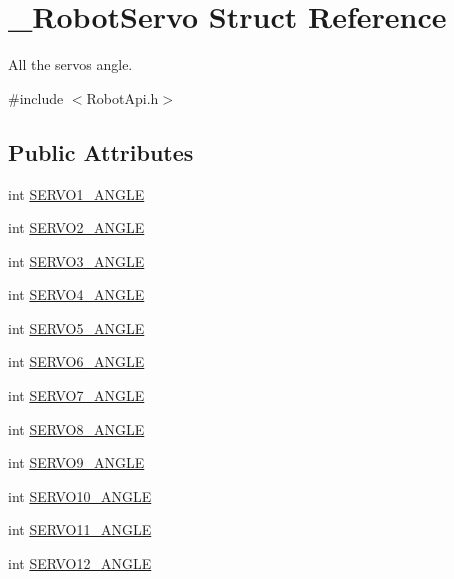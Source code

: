 \hypertarget{struct__RobotServo}{}\section{\+\_\+\+Robot\+Servo Struct Reference}
\label{struct__RobotServo}


All the servos angle.  




{\ttfamily \#include $<$Robot\+Api.\+h$>$}

\subsection*{Public Attributes}
\begin{DoxyCompactItemize}
\item 
int \hyperlink{struct__RobotServo_a1f1a8a3bbe5ead1dd6d601759a5ca98f}{S\+E\+R\+V\+O1\+\_\+\+A\+N\+G\+LE}
\item 
int \hyperlink{struct__RobotServo_afb1c3bb48d9ea043220aea87d53727b0}{S\+E\+R\+V\+O2\+\_\+\+A\+N\+G\+LE}
\item 
int \hyperlink{struct__RobotServo_ab11e8be260c447c377f2b00c1036d1a3}{S\+E\+R\+V\+O3\+\_\+\+A\+N\+G\+LE}
\item 
int \hyperlink{struct__RobotServo_a2812900c05863c2212a91adb1dcf8b2b}{S\+E\+R\+V\+O4\+\_\+\+A\+N\+G\+LE}
\item 
int \hyperlink{struct__RobotServo_aaacf4e0cf957dc248063ee6216b0235f}{S\+E\+R\+V\+O5\+\_\+\+A\+N\+G\+LE}
\item 
int \hyperlink{struct__RobotServo_ad5c48927ae8cd2377f25ae84e20a7474}{S\+E\+R\+V\+O6\+\_\+\+A\+N\+G\+LE}
\item 
int \hyperlink{struct__RobotServo_a4d9a37b2ebbf5446b3495965880232c3}{S\+E\+R\+V\+O7\+\_\+\+A\+N\+G\+LE}
\item 
int \hyperlink{struct__RobotServo_a996aa08a6ff475cc98c13d1fe43fa961}{S\+E\+R\+V\+O8\+\_\+\+A\+N\+G\+LE}
\item 
int \hyperlink{struct__RobotServo_a7c262cfcbbf1246556a7f7a23a35275f}{S\+E\+R\+V\+O9\+\_\+\+A\+N\+G\+LE}
\item 
int \hyperlink{struct__RobotServo_a49ee2878d449d0c5f9578abdc6ea7b67}{S\+E\+R\+V\+O10\+\_\+\+A\+N\+G\+LE}
\item 
int \hyperlink{struct__RobotServo_ad98e244e46ee9b7b66799a5afab0dd85}{S\+E\+R\+V\+O11\+\_\+\+A\+N\+G\+LE}
\item 
int \hyperlink{struct__RobotServo_a26ff7f43241c15f676aca403e4c1056b}{S\+E\+R\+V\+O12\+\_\+\+A\+N\+G\+LE}

\end{DoxyCompactItemize}

